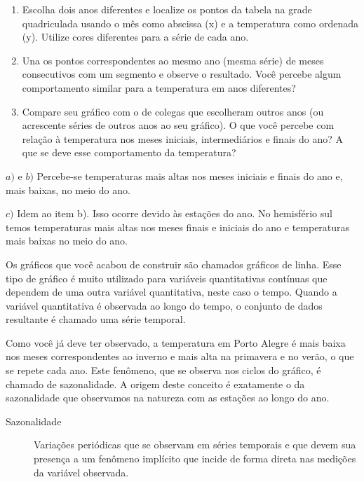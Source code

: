 \begin{enumerate}
\item {} 
Escolha dois anos diferentes e localize os pontos da tabela na grade quadriculada usando o mês como abscissa (x) e a temperatura como ordenada (y). Utilize cores diferentes para a série de cada ano.

\item {} 
Una os pontos correspondentes ao mesmo ano (mesma série) de meses consecutivos com um segmento e observe o resultado. Você percebe algum comportamento similar para a  temperatura em anos diferentes?

\item {} 
Compare seu gráfico com o de colegas que escolheram outros anos (ou acrescente séries de outros anos ao seu gráfico). O que você percebe com relação à temperatura nos meses iniciais, intermediários e finais do ano?  A que se deve esse comportamento da temperatura?

\end{enumerate}

\(a)\) e \(b)\) Percebe-se temperaturas mais altas nos meses iniciais e finais do ano e, mais baixas, no meio do ano.
\begin{quote}

\begin{figure}[H]
\centering

\noindent{}
\end{figure}
\end{quote}

\(c)\) Idem ao item b). Isso ocorre devido às estações do ano. No hemisfério sul temos temperaturas mais altas nos meses finais e iniciais do ano e temperaturas mais baixas no meio do ano.

Os gráficos que você acabou de construir são chamados gráficos de linha. Esse tipo de gráfico é muito utilizado para variáveis quantitativas contínuas que dependem de uma outra variável quantitativa, neste caso o tempo. Quando a variável quantitativa é observada ao longo do tempo, o conjunto de dados resultante é chamado uma série temporal.

\begin{observation}{}

Como você já deve ter observado, a temperatura em Porto Alegre é mais baixa nos meses correspondentes ao inverno e mais alta na primavera e no verão, o que se repete cada ano. Este fenômeno, que se observa nos ciclos do gráfico, é chamado de sazonalidade. A origem deste conceito é exatamente o da sazonalidade que observamos na natureza com as estações ao longo do ano.
\end{observation}
\begin{description}
\item[{Sazonalidade}] \leavevmode{}\label{\detokenize{PE103-3:term-sazonalidade}}
Variações periódicas que se observam em séries temporais e que devem sua presença a um fenômeno implícito que incide de forma direta nas medições da variável observada.

\end{description}

